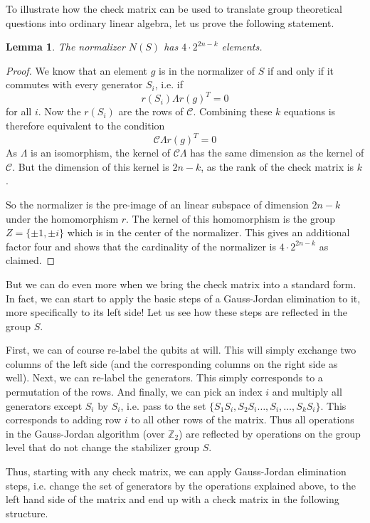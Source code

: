 \documentclass[a4paper, draft]{article}
\theoremstyle{own}
\newtheorem{lem}[thm]{Lemma}
\theoremstyle{remark}
\newcommand{\Z}{\mathbb{Z}}
\begin{document}
To illustrate how the check matrix can be used to translate group theoretical questions into ordinary linear algebra, let us prove the following statement.

\begin{lem}
The normalizer $N(S)$ has $4 \cdot 2^{2n-k}$ elements. 
\end{lem} 

\begin{proof}
We know that an element $g$ is in the normalizer of $S$ if and only if it commutes with every generator $S_i$, i.e. if
$$
r(S_i) \Lambda r(g)^T = 0
$$
for all $i$. Now the $r(S_i)$ are the rows of $\mathcal{C}$. Combining these $k$ equations is therefore equivalent to the condition
$$
\mathcal{C} \Lambda r(g)^T = 0
$$
As $\Lambda$ is an isomorphism, the kernel of $\mathcal{C} \Lambda$ has the same dimension as the kernel of $\mathcal{C}$. But the dimension of this kernel is $2n-k$, as the rank of the check matrix is $k$. 

So the normalizer is the pre-image of an linear subspace of dimension $2n-k$ under the homomorphism $r$. The kernel of this homomorphism is the group $Z = \{ \pm 1, \pm i  \}$
which is in the center of the normalizer. This gives an additional factor four and shows that the cardinality of the normalizer is $4 \cdot 2^{2n - k }$ as claimed.
\end{proof}

But we can do even more when we bring the check matrix into a standard form. In fact, we can start to apply the basic steps of a Gauss-Jordan elimination to it, more specifically to its left side! Let us see how these steps are reflected in the group $S$.

First, we can of course re-label the qubits at will. This will simply exchange two columns of the left side (and the corresponding columns on the right side as well). Next, we can re-label the generators. This simply corresponds to a permutation of the rows. And finally, we can pick an index $i$ and multiply all generators except $S_i$ by $S_i$, i.e. pass to the set $\{ S_1 S_i, S_2 S_i \dots, S_i , \dots, S_k S_i\}$. This corresponds to adding row $i$ to all other rows of the matrix. Thus all operations in the Gauss-Jordan algorithm (over $\Z_2$) are reflected by operations on the group level that do not change the stabilizer group $S$. 

Thus, starting with any check matrix, we can apply Gauss-Jordan elimination steps, i.e. change the set of generators by the operations explained above, to the left hand side of the matrix and end up with a check matrix in the following structure.
\end{document}
